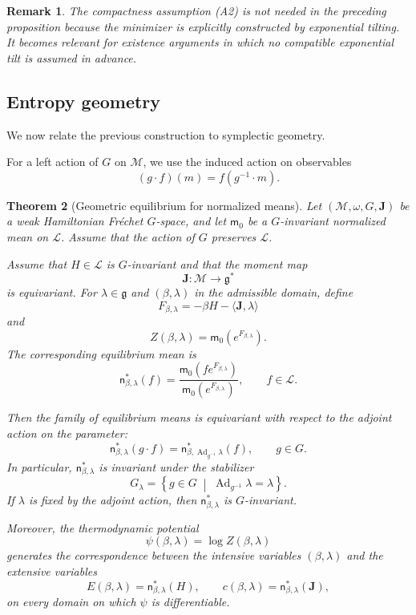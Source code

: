 \documentclass[10pt,a4paper]{amsart}
\newtheorem{Theorem}{Theorem}[section]
\newtheorem{rem}[Theorem]{Remark}
\begin{document}
\begin{rem}
The compactness assumption \textup{(A2)} is not needed in the preceding
proposition because the minimizer is explicitly constructed by
exponential tilting. It becomes relevant for existence arguments in
which no compatible exponential tilt is assumed in advance.
\end{rem}

\subsection{Entropy geometry}

We now relate the previous construction to symplectic geometry.

For a left action of $G$ on $\mathcal M$, we use the induced action on
observables
\[
(g\cdot f)(m)=f(g^{-1}\cdot m).
\]


\begin{Theorem}[Geometric equilibrium for normalized means]
\label{thm:geom-eq}
Let $(\mathcal M,\omega,G,\mathbf J)$ be a weak Hamiltonian Fréchet
$G$-space, and let $\mathsf m_0$ be a $G$-invariant normalized mean on
$\mathcal L$. Assume that the action of $G$ preserves $\mathcal L$.

Assume that $H\in\mathcal L$ is $G$-invariant and that the moment map
\[
\mathbf J\colon\mathcal M\longrightarrow\mathfrak g^*
\]
is equivariant. For $\lambda\in\mathfrak g$ and
$(\beta,\lambda)$ in the admissible domain, define
\[
F_{\beta,\lambda}
=
-\beta H-\langle\mathbf J,\lambda\rangle
\]
and
\[
Z(\beta,\lambda)
=
\mathsf m_0\left(e^{F_{\beta,\lambda}}\right).
\]
The corresponding equilibrium mean is
\[
\mathsf n_{\beta,\lambda}^{*}(f)
=
\frac{
\mathsf m_0\left(fe^{F_{\beta,\lambda}}\right)
}{
\mathsf m_0\left(e^{F_{\beta,\lambda}}\right)
},
\qquad
f\in\mathcal L.
\]

Then the family of equilibrium means is equivariant with respect to the
adjoint action on the parameter:
\[
\mathsf n_{\beta,\lambda}^{*}(g\cdot f)
=
\mathsf n_{\beta,\operatorname{Ad}_{g^{-1}}\lambda}^{*}(f),
\qquad
g\in G.
\]
In particular, $\mathsf n_{\beta,\lambda}^{*}$ is invariant under the
stabilizer
\[
G_\lambda
=
\left\{
g\in G
\;\middle|\;
\operatorname{Ad}_{g^{-1}}\lambda=\lambda
\right\}.
\]
If $\lambda$ is fixed by the adjoint action, then
$\mathsf n_{\beta,\lambda}^{*}$ is $G$-invariant.

Moreover, the thermodynamic potential
\[
\psi(\beta,\lambda)=\log Z(\beta,\lambda)
\]
generates the correspondence between the intensive variables
$(\beta,\lambda)$ and the extensive variables
\[
E(\beta,\lambda)
=
\mathsf n_{\beta,\lambda}^{*}(H),
\qquad
c(\beta,\lambda)
=
\mathsf n_{\beta,\lambda}^{*}(\mathbf J),
\]
on every domain on which $\psi$ is differentiable.
\end{Theorem}
\end{document}
